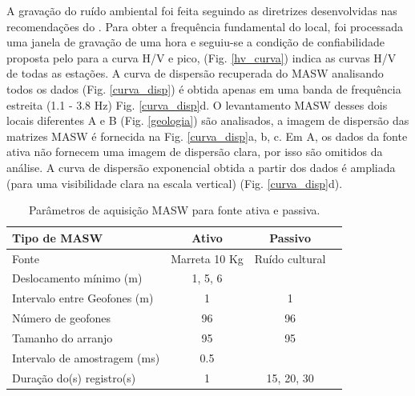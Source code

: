 \documentclass[smallextended]{svjour3}       %
\begin{document}
A gravação do ruído ambiental foi feita seguindo as diretrizes desenvolvidas nas recomendações do \cite{acerra2004guidelines}. Para obter a frequência fundamental do local, foi processada uma janela de gravação de uma hora e seguiu-se a condição de confiabilidade proposta pelo \cite{acerra2004guidelines} para a curva H/V e pico, (Fig. \ref{hv_curva}) indica as curvas H/V de todas as estações. A curva de dispersão recuperada do MASW analisando todos os dados (Fig. \ref{curva_disp}) é obtida apenas em uma banda de frequência estreita (1.1 - 3.8 Hz) Fig. \ref{curva_disp}d. O levantamento MASW desses dois locais diferentes A e B (Fig. \ref{geologia}) são analisados, a imagem de dispersão das matrizes MASW é fornecida na Fig. \ref{curva_disp}a, b, c. Em A, os dados da fonte ativa não fornecem uma imagem de dispersão clara, por isso são omitidos da análise. A curva de dispersão exponencial obtida a partir dos dados é ampliada (para uma visibilidade clara na escala vertical) (Fig. \ref{curva_disp}d).


\begin{table}[!hbtp]
\caption{Parâmetros de aquisição MASW para fonte ativa e passiva.}
\label{table_parameters}
\centering
\begin{tabular}{@{}lccc@{}}
\toprule
Tipo de MASW         & Ativo & Passivo &  \\ \midrule
Fonte & Marreta 10 Kg         & Ruído cultural                    \\
Deslocamento mínimo (m)   & 1, 5, 6       &                         \\
Intervalo entre Geofones (m)      & 1             & 1                             \\
Número de geofones             & 96              & 96                                    \\ 
Tamanho do arranjo               & 95              & 95                                   \\ 
Intervalo de amostragem (ms)              & 0.5              &                                      \\ 
Duração do(s) registro(s)              & 1              & 15, 20, 30                                  \\ \bottomrule
\end{tabular}
\end{table}
\end{document}
